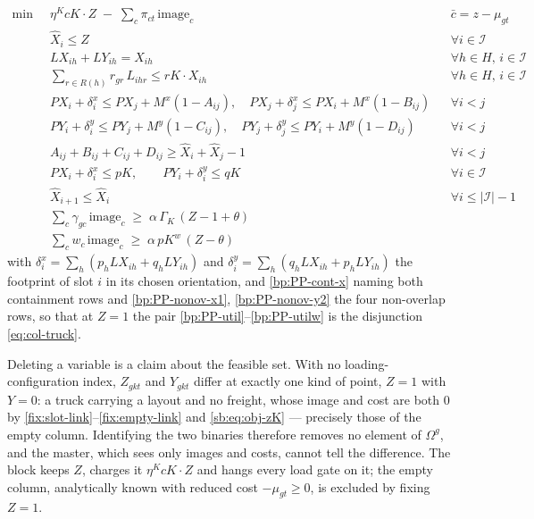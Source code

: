 \begin{align}
  \min\;\; & \eta^{K}cK\cdot Z \;-\; \sum_{c}\pi_{ct}\,\mathrm{image}_{c}
    && \bar c = z-\mu_{gt} \label{bp:PP-objective}\\
  & \widehat{X}_{i} \le Z && \forall i \in \mathcal{I} \label{bp:PP-slot-active}\\
  & \mathit{LX}_{ih} + \mathit{LY}_{ih} = X_{ih}
    && \forall h \in H,\, i \in \mathcal{I} \label{bp:PP-orient}\\
  & \sum_{r \in R(h)} r_{gr}\,L_{ihr} \le \mathit{rK}\cdot X_{ih}
    && \forall h \in H,\, i \in \mathcal{I} \label{bp:PP-height}\\
  & \mathit{PX}_{i} + \delta^{x}_{i} \le \mathit{PX}_{j} + M^{x}(1-A_{ij}),
    \quad
    \mathit{PX}_{j} + \delta^{x}_{j} \le \mathit{PX}_{i} + M^{x}(1-B_{ij})
    && \forall i<j \label{bp:PP-nonov-x1}\\
  & \mathit{PY}_{i} + \delta^{y}_{i} \le \mathit{PY}_{j} + M^{y}(1-C_{ij}),
    \quad
    \mathit{PY}_{j} + \delta^{y}_{j} \le \mathit{PY}_{i} + M^{y}(1-D_{ij})
    && \forall i<j \label{bp:PP-nonov-y2}\\
  & A_{ij}+B_{ij}+C_{ij}+D_{ij} \ge \widehat{X}_{i}+\widehat{X}_{j}-1
    && \forall i<j \label{bp:PP-cover}\\
  & \mathit{PX}_{i} + \delta^{x}_{i} \le \mathit{pK},
    \qquad
    \mathit{PY}_{i} + \delta^{y}_{i} \le \mathit{qK}
    && \forall i \in \mathcal{I} \label{bp:PP-cont-x}\\
  & \widehat{X}_{i+1} \le \widehat{X}_{i}
    && \forall i \le |\mathcal{I}|-1 \label{bp:PP-sym}\\
  & \sum_{c}\gamma_{gc}\,\mathrm{image}_{c}
      \;\ge\;\alpha\,\Gamma_{K}\,(Z-1+\theta) \label{bp:PP-util}\\
  & \sum_{c} w_{c}\,\mathrm{image}_{c}
      \;\ge\;\alpha\,\mathit{pK}^{w}\,(Z-\theta) \label{bp:PP-utilw}
\end{align}
with $\delta^{x}_{i}=\sum_{h}(p_{h}\mathit{LX}_{ih}+q_{h}\mathit{LY}_{ih})$
and $\delta^{y}_{i}=\sum_{h}(q_{h}\mathit{LX}_{ih}+p_{h}\mathit{LY}_{ih})$
the footprint of slot $i$ in its chosen orientation, and
\eqref{bp:PP-cont-x} naming both containment rows and
\eqref{bp:PP-nonov-x1}, \eqref{bp:PP-nonov-y2} the four non-overlap
rows, so that at $Z=1$ the pair
\eqref{bp:PP-util}--\eqref{bp:PP-utilw} is the disjunction
\eqref{eq:col-truck}.

Deleting a variable is a claim about the feasible set. With no
loading-configuration index, $Z_{gkt}$ and $Y_{gkt}$ differ at exactly
one kind of point, $Z=1$ with $Y=0$: a truck carrying a layout and no
freight, whose image and cost are both $0$ by
\eqref{fix:slot-link}--\eqref{fix:empty-link} and
\eqref{sb:eq:obj-zK} --- precisely those of the empty column.
Identifying the two binaries therefore removes no element of
$\Omega^{g}$, and the master, which sees only images and costs, cannot
tell the difference. The block keeps $Z$, charges it
$\eta^{K}cK\cdot Z$ and hangs every load gate on it; the empty
column, analytically known with reduced cost $-\mu_{gt}\ge0$, is
excluded by fixing $Z=1$.

